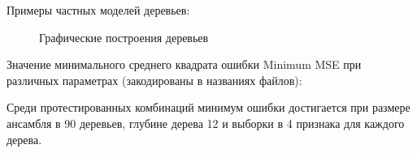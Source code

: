 \documentclass{article} %
\begin{document}
\clearpage
Примеры частных моделей деревьев:
\begin{figure}[H]
	\centering
	\hfill
    \caption{Графические построения деревьев}
\end{figure}
\bigskip

Значение минимального среднего квадрата ошибки Minimum MSE
при различных параметрах (закодированы в названиях файлов):


\begin{figure}[H]
	\centering
	\hfill
\end{figure}
\begin{figure}[H]
	\centering
	\hfill
\end{figure}
\begin{figure}[H]
	\centering
	\hfill
\end{figure}
\begin{figure}[H]
	\centering
	\hfill
\end{figure}
\bigskip

Среди протестированных комбинаций минимум ошибки достигается
при размере ансамбля в 90 деревьев,
глубине дерева 12 и выборки в 4 признака для каждого дерева.
\end{document}
